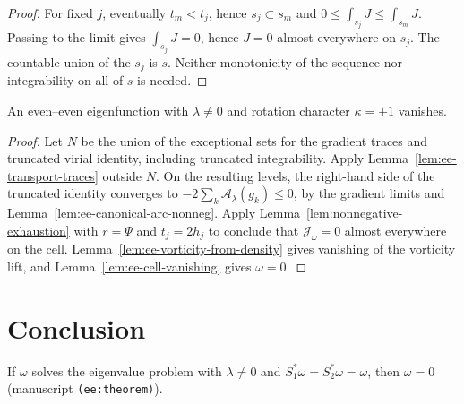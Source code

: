 \begin{proof}
\leanok
For fixed $j$, eventually $t_m<t_j$, hence $s_j\subset s_m$ and
$0\le\int_{s_j}J\le\int_{s_m}J$. Passing to the limit gives $\int_{s_j}J=0$, hence
$J=0$ almost everywhere on $s_j$. The countable union of the $s_j$ is $s$.
Neither monotonicity of the sequence nor integrability on all of $s$ is needed.
\end{proof}

\begin{lemma}
\label{lem:ee-character-exclusion}
\leanok
An even--even eigenfunction with $\lambda\ne0$ and rotation character $\kappa=\pm1$
vanishes.
\end{lemma}

\begin{proof}
\leanok
Let $N$ be the union of the exceptional sets for the gradient traces and truncated virial
identity, including truncated integrability. Apply Lemma~\ref{lem:ee-transport-traces}
outside $N$. On the resulting levels, the right-hand side of the truncated identity
converges to $-2\sum_k\mathcal A_\lambda(g_k)\le0$, by the gradient limits and
Lemma~\ref{lem:ee-canonical-arc-nonneg}. Apply Lemma~\ref{lem:nonnegative-exhaustion}
with $r=\Psi$ and $t_j=2h_j$ to conclude that $\mathcal J_\omega=0$ almost everywhere on
the cell. Lemma~\ref{lem:ee-vorticity-from-density} gives vanishing of the vorticity
lift, and Lemma~\ref{lem:ee-cell-vanishing} gives $\omega=0$.
\end{proof}

\section{Conclusion}

\begin{theorem}
\label{thm:ee-exclusion}
\leanok
If $\omega$ solves the eigenvalue problem with $\lambda\ne0$ and
$S_1^*\omega=S_2^*\omega=\omega$, then $\omega=0$ (manuscript
\texttt{(ee:theorem)}).
\end{theorem}

